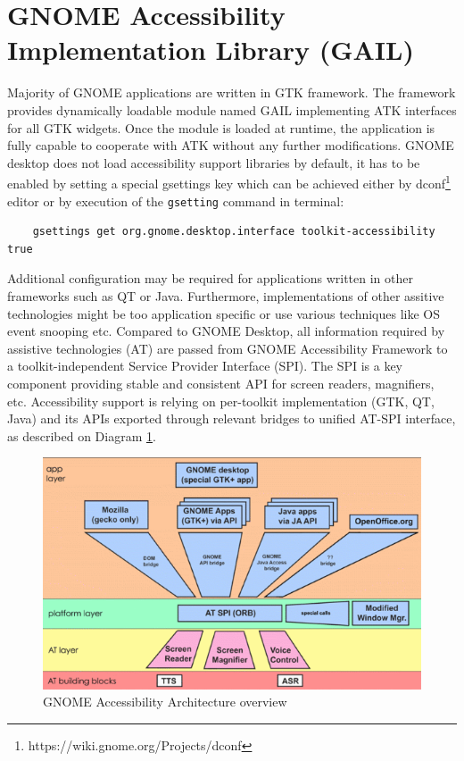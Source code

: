 \section{GNOME Accessibility Implementation Library (GAIL)}
Majority of GNOME applications are written in GTK framework. The framework provides dynamically loadable module named GAIL implementing ATK interfaces for all GTK widgets. Once the module is loaded at runtime, the application is fully capable to cooperate with ATK without any further modifications.
GNOME desktop does not load accessibility support libraries by default, it has to be enabled by setting a special gsettings key which can be achieved either by dconf\footnote{https://wiki.gnome.org/Projects/dconf} editor or by execution of the \texttt{gsetting} command in terminal:
\begin{verbatim}
    gsettings get org.gnome.desktop.interface toolkit-accessibility true
\end{verbatim}
Additional configuration may be required for applications written in other frameworks such as QT or Java. Furthermore, implementations of other assitive technologies might be too application specific or use various techniques like OS event snooping etc. Compared to GNOME Desktop, all information required by assistive technologies (AT) are passed from GNOME Accessibility Framework to a toolkit-independent Service Provider Interface (SPI). The SPI is a key component providing stable and consistent API for screen readers, magnifiers, etc. Accessibility support is relying on per-toolkit implementation (GTK, QT, Java) and its APIs exported through relevant bridges to unified AT-SPI interface, as described on Diagram \ref{ATSPI_architecture}.

\begin{figure}[hbt]
	\centering
	\includegraphics[width=1\textwidth]{obrazky-figures/GNOME_desktop_Accessibility.png}
	\caption{GNOME Accessibility Architecture overview}
	\label{ATSPI_architecture}
\end{figure}

